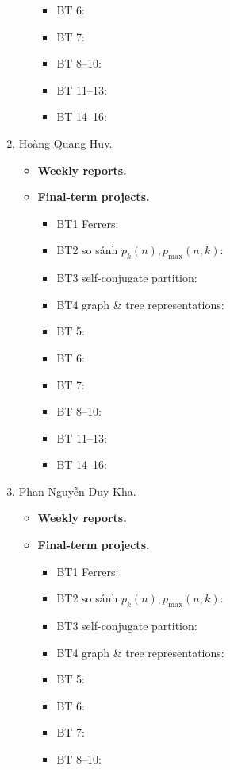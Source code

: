 \documentclass{article}
\begin{document}
\begin{enumerate}
\begin{itemize}
\begin{itemize}
            \item BT 6:
            \item BT 7:
            \item BT 8--10:
            \item BT 11--13:
            \item BT 14--16:
        \end{itemize}
    \end{itemize}
    \item {\sc Hoàng Quang Huy.}
    \begin{itemize}
        \item {\bf Weekly reports.}
        \item {\bf Final-term projects.}
        \begin{itemize}
            \item BT1 Ferrers:
            \item BT2 so sánh $p_k(n),p_{\max}(n,k)$:
            \item BT3 self-conjugate partition:
            \item BT4 graph \& tree representations:
            \item BT 5:
            \item BT 6:
            \item BT 7:
            \item BT 8--10:
            \item BT 11--13:
            \item BT 14--16:
        \end{itemize}
    \end{itemize}
    \item {\sc Phan Nguyễn Duy Kha.}
    \begin{itemize}
        \item {\bf Weekly reports.}
        \item {\bf Final-term projects.}
        \begin{itemize}
            \item BT1 Ferrers:
            \item BT2 so sánh $p_k(n),p_{\max}(n,k)$:
            \item BT3 self-conjugate partition:
            \item BT4 graph \& tree representations:
            \item BT 5:
            \item BT 6:
            \item BT 7:
            \item BT 8--10:

\end{itemize}
\end{itemize}
\end{enumerate}
\end{document}
